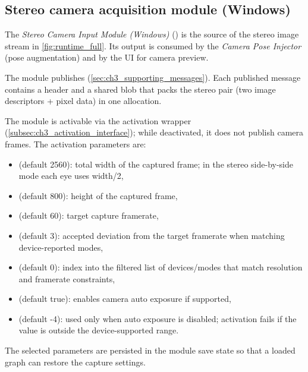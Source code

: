 \subsection{Stereo camera acquisition module (Windows)}
\label{subsec:ch4_mod_stereo_camera}

The \emph{Stereo Camera Input Module (Windows)} () is the source of the stereo image stream in \autoref{fig:runtime_full}.
Its output is consumed by the \emph{Camera Pose Injector} (pose augmentation) and by the UI for camera preview.

The module publishes  (\autoref{sec:ch3_supporting_messages}).
Each published message contains a  header and a shared blob that packs the stereo pair (two image descriptors + pixel data) in one allocation.

The module is activable via the activation wrapper (\autoref{subsec:ch3_activation_interface}); while deactivated, it does not publish camera frames.
The activation parameters are:
\begin{itemize}[nosep]
    \item {} (default 2560): total width of the captured frame; in the stereo side-by-side mode each eye uses width/2,
    \item {} (default 800): height of the captured frame,
    \item {} (default 60): target capture framerate,
    \item {} (default 3): accepted deviation from the target framerate when matching device-reported modes,
    \item {} (default 0): index into the filtered list of devices/modes that match resolution and framerate constraints,
    \item {} (default true): enables camera auto exposure if supported,
    \item {} (default -4): used only when auto exposure is disabled; activation fails if the value is outside the device-supported range.
\end{itemize}
The selected parameters are persisted in the module save state so that a loaded graph can restore the capture settings.

